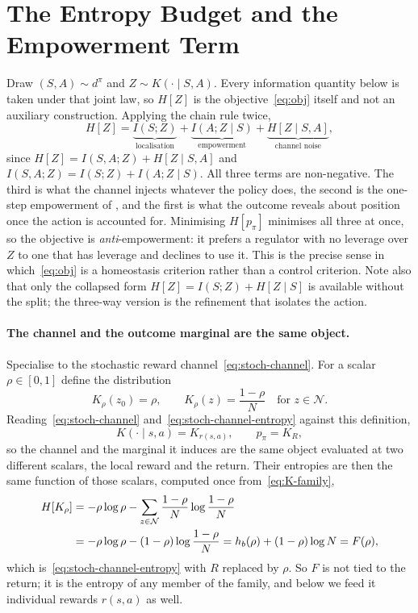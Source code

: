 \documentclass[11pt]{article}
\theoremstyle{remark}
\newcommand{\Ncal}{\mathcal N}
\newcommand{\1}{\mathds{1}}
\newcommand{\occ}{d^{\pi}}
\newcommand{\pz}{p_{\pi}}
\newcommand{\Hf}[1]{H\!\left[#1\right]}
\begin{document}
\section{The Entropy Budget and the Empowerment Term}
\label{sec:budget}
Draw $(S,A)\sim\occ$ and $Z\sim K(\cdot\mid S,A)$.
Every information quantity below is taken under that joint law, so $\Hf{Z}$ is the objective~\eqref{eq:obj} itself and not an auxiliary construction.
Applying the chain rule twice,
\begin{equation}
  \Hf{Z}
  =\underbrace{I(S;Z)}_{\text{localisation}}
  +\underbrace{I(A;Z\mid S)}_{\text{empowerment}}
  +\underbrace{\Hf{Z\mid S,A}}_{\text{channel noise}},
  \label{eq:budget}
\end{equation}
since $\Hf{Z}=I(S,A;Z)+\Hf{Z\mid S,A}$ and $I(S,A;Z)=I(S;Z)+I(A;Z\mid S)$.
All three terms are non-negative.
The third is what the channel injects whatever the policy does, the second is the one-step empowerment of \citet{Klyubin-empowerment05}, and the first is what the outcome reveals about position once the action is accounted for.
Minimising $\Hf{\pz}$ minimises all three at once, so the objective is \emph{anti}-empowerment: it prefers a regulator with no leverage over $Z$ to one that has leverage and declines to use it.
This is the precise sense in which~\eqref{eq:obj} is a homeostasis criterion rather than a control criterion.
Note also that only the collapsed form $\Hf{Z}=I(S;Z)+\Hf{Z\mid S}$ is available without the split; the three-way version is the refinement that isolates the action.

\paragraph{The channel and the outcome marginal are the same object.}
Specialise to the stochastic reward channel~\eqref{eq:stoch-channel}.
For a scalar $\rho\in[0,1]$ define the distribution
\begin{equation}
  K_\rho(z_0)=\rho,
  \qquad
  K_\rho(z)=\frac{1-\rho}{N}\quad\text{for } z\in\Ncal .
  \label{eq:K-family}
\end{equation}
Reading~\eqref{eq:stoch-channel} and~\eqref{eq:stoch-channel-entropy} against this definition,
\begin{equation}
  K(\cdot\mid s,a)=K_{r(s,a)},
  \qquad
  \pz=K_R ,
  \label{eq:same-family}
\end{equation}
so the channel and the marginal it induces are the same object evaluated at two different scalars, the local reward and the return.
Their entropies are then the same function of those scalars, computed once from~\eqref{eq:K-family},
\begin{align}
  \Hf{K_\rho}
  &=-\rho\log\rho-\sum_{z\in\Ncal}\frac{1-\rho}{N}\log\frac{1-\rho}{N} \notag\\
  &=-\rho\log\rho-(1-\rho)\log\frac{1-\rho}{N}
  =h_b(\rho)+(1-\rho)\log N=F(\rho) ,
  \label{eq:F-family}
\end{align}
which is~\eqref{eq:stoch-channel-entropy} with $R$ replaced by $\rho$.
So $F$ is not tied to the return; it is the entropy of any member of the family, and below we feed it individual rewards $r(s,a)$ as well.
\end{document}
